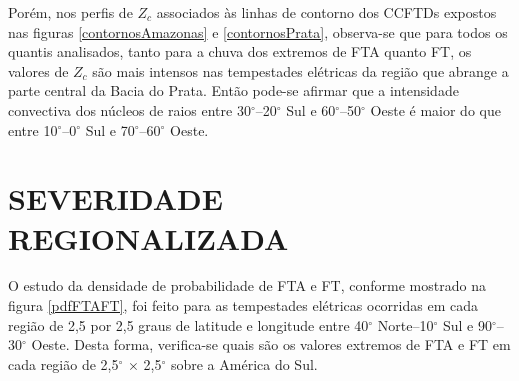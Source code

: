 Porém, nos perfis de $Z_c$ associados às linhas de contorno dos CCFTDs expostos nas figuras \ref{contornosAmazonas} e \ref{contornosPrata}, observa-se que para todos os quantis analisados, tanto para a chuva dos extremos de FTA quanto FT, os valores de $Z_c$ são mais intensos nas tempestades elétricas da região que abrange a parte central da Bacia do Prata. Então pode-se afirmar que a intensidade convectiva dos núcleos de raios entre 30$^{\circ}$--20$^{\circ}$ Sul e 60$^{\circ}$--50$^{\circ}$ Oeste é maior do que entre 10$^{\circ}$--0$^{\circ}$ Sul e 70$^{\circ}$--60$^{\circ}$ Oeste. 


\section{SEVERIDADE REGIONALIZADA}


O estudo da densidade de probabilidade de FTA e FT, conforme mostrado na figura \ref{pdfFTAFT}, foi feito para as tempestades elétricas ocorridas em cada região de 2,5 por 2,5 graus de latitude e longitude entre 40$^{\circ}$ Norte--10$^{\circ}$ Sul e 90$^{\circ}$--30$^{\circ}$ Oeste. Desta forma, verifica-se quais são os valores extremos de FTA e FT em cada região de 2,5$^{\circ}$ $\times$ 2,5$^{\circ}$ sobre a América do Sul. 



